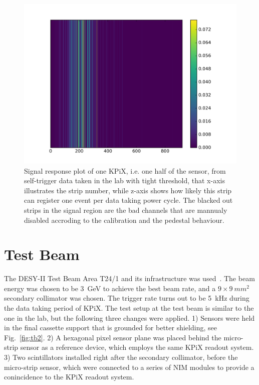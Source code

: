 \documentclass[conference]{IEEEtran}
\begin{document}
\begin{figure}[!ht]%
  \centering
  \includegraphics[width=1.0\linewidth]{pics/2018_07_13_16_34_20_strip_map_left.png}
  \caption{
  Signal response plot of one KPiX, i.e. one half of the sensor, from self-trigger data taken in the lab with tight threshold,
  that x-axis illustrates the strip number, while z-axis shows how likely this strip can register one event per data taking power cycle.
  The blacked out strips in the signal region are the bad channels that are mannualy disabled accroding to the calibration and the pedestal behaviour.
  }%
\label{fig:lab2}%
\end{figure}


\section{Test Beam}
The DESY-II Test Beam Area T24/1 and its infrastructure was used~\cite{desytbf}.
The beam energy was chosen to be \SI{3}{GeV} to achieve the best beam rate, and a $9\times\SI{9}{mm^2}$ secondary collimator was chosen.
The trigger rate turns out to be \SI{5}{kHz} during the data taking period of KPiX.
The test setup at the test beam is similar to the one in the lab, but the following three changes were applied.
1) Sensors were held in the final cassette support that is grounded for better shielding, see Fig.~\ref{fig:tb2}.
2) A hexagonal pixel sensor plane was placed behind the micro-strip sensor as a reference device, which employs the same KPiX readout system.
3) Two scintillators installed right after the secondary collimator, before the micro-strip sensor, which were connected to a series of NIM modules to provide a conincidence to the KPiX readout system.
\end{document}
